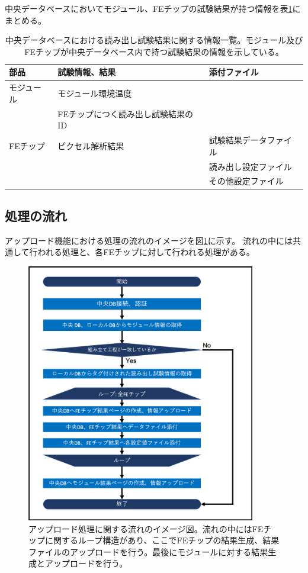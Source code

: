 中央データベースにおいてモジュール、FEチップの試験結果が持つ情報を表\ref{electrical_parameters}にまとめる。
\begin{table}[tbp]
\begin{center}
\caption[中央データベースにおける読み出し試験結果に関する情報一覧]{中央データベースにおける読み出し試験結果に関する情報一覧。モジュール及びFEチップが中央データベース内で持つ試験結果の情報を示している。}
\label{electrical_parameters}
  \small
  \begin{tabular}{|l|l|l|} \hline
    部品 & 試験情報、結果 & 添付ファイル \\ \hline\hline
    モジュール &  モジュール環境温度 & \\  
               &  FEチップにつく読み出し試験結果のID & \\  \hline
    FEチップ &  ピクセル解析結果 & 試験結果データファイル\\ 
             &                   & 読み出し設定ファイル\\
             &                   & その他設定ファイル\\ \hline 
  \end{tabular}
\end{center}
\end{table}

\subsection{処理の流れ}

アップロード機能における処理の流れのイメージを図\ref{upload_algorithm}に示す。
流れの中には共通して行われる処理と、各FEチップに対して行われる処理がある。

\begin{figure}[bpt]\centering
\includegraphics[width=10cm]{./upload_algorithm.png}
\caption[アップロード処理に関する流れのイメージ図]{アップロード処理に関する流れのイメージ図。流れの中にはFEチップに関するループ構造があり、ここでFEチップの結果生成、結果ファイルのアップロードを行う。最後にモジュールに対する結果生成とアップロードを行う。}
\label{upload_algorithm}
\end{figure}

